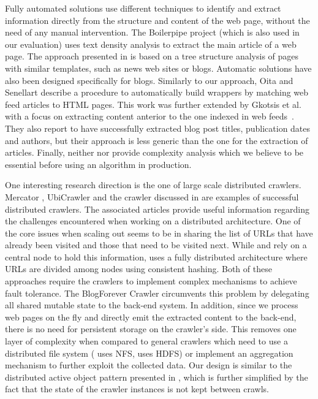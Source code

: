 Fully automated solutions use different techniques to identify and 
extract information directly from the structure and content of the web 
page, without the need of any manual intervention. The Boilerpipe project 
\cite{kohlschuetter2010} (which is also used in our evaluation) uses text 
density analysis to extract the main article of a web page. The approach 
presented in \cite{treeedit} is based on a tree structure analysis of 
pages with similar templates, such as news web sites or blogs. Automatic 
solutions have also been designed specifically for blogs. Similarly to 
our approach, Oita and Senellart \cite{oita2010} describe a procedure 
to automatically build wrappers by matching web feed articles to
HTML pages. This work was further extended by Gkotsis et al. with 
a focus on extracting content anterior to the one indexed in web 
feeds~\cite{gkotsis2013}. They also report to have successfully extracted 
blog post titles, publication dates and authors, but their approach 
is less generic than the one for the extraction of articles. Finally, 
neither \cite{oita2010} nor \cite{gkotsis2013} provide complexity 
analysis which we believe to be essential before using an algorithm 
in production.

One interesting research direction is the one of large scale distributed 
crawlers. Mercator \cite{heydon99mercator}, UbiCrawler \cite{boldi2003} 
and the crawler discussed in \cite{shkapenyuk2002} are examples of 
successful distributed crawlers. The associated articles provide useful 
information regarding the challenges encountered when working on a 
distributed architecture. One of the core issues when scaling out seems 
to be in sharing the list of URLs that have already been visited and 
those that need to be visited next. While \cite{heydon99mercator} and 
\cite{shkapenyuk2002} rely on a central node to hold this information, 
\cite{boldi2003} uses a fully distributed architecture where URLs are 
divided among nodes using consistent hashing. Both of these approaches 
require the crawlers to implement complex mechanisms to achieve 
fault tolerance. The BlogForever Crawler circumvents this problem by 
delegating all shared mutable state to the back-end system. In addition, 
since we process web pages on the fly and directly emit the extracted 
content to the back-end, there is no need for persistent storage on 
the crawler's side. This removes one layer of complexity when compared 
to general crawlers which need to use a distributed file system 
(\cite{shkapenyuk2002} uses NFS, \cite{berger2011} uses HDFS) or 
implement an aggregation mechanism to further exploit the collected data. 
Our design is similar to the distributed active object pattern presented 
in \cite{activeobject1996}, which is further simplified by the fact that 
the state of the crawler instances is not kept between crawls.

